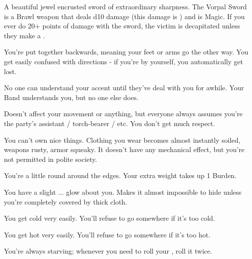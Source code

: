 \begin{multicols*}{2}

A beautiful jewel encrusted sword of extraordinary sharpness.  The Vorpal Sword is a \VIG Brawl weapon that deals d10 damage (this damage is ) and is Magic.  If you ever do 20+ points of damage with the sword, the victim is decapitated unless they make a .

\newpage



You're put together backwards, meaning your feet or arms go the other way.  You get easily confused with directions - if you're by yourself, you automatically get lost.


No one can understand your accent until they've deal with you for awhile.  Your Band understands you, but no one else does.


Doesn't affect your movement or anything, but everyone always assumes you're the party's assistant / torch-bearer / etc.  You don't get much respect.



You can't own nice things.  Clothing you wear becomes almost instantly soiled, weapons rusty, armor squeaky.  It doesn't have any mechanical effect, but you're not permitted in polite society.


You're a little round around the edges.  Your extra weight takes up 1 Burden.

\cbreak


You have a slight ... glow about you. Makes it almost impossible to hide unless you're completely covered by thick cloth. 


You get cold very easily.  You'll refuse to go somewhere if it's too cold.


You get hot very easily.  You'll refuse to go somewhere if it's too hot.


You're always starving; whenever you need to roll your  \UD, roll it twice.



\end{multicols*}
